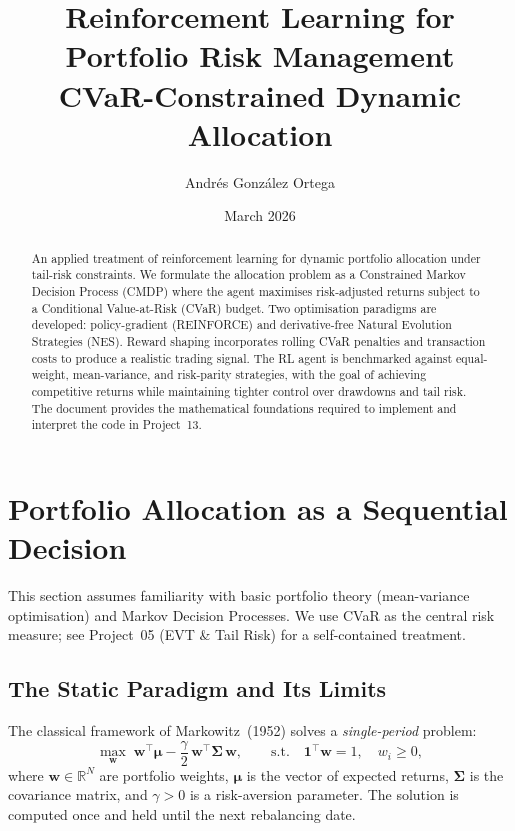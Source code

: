 \documentclass[11pt, a4paper]{article}
\title{%
    \textbf{Reinforcement Learning for Portfolio Risk Management} \\[0.5em]
    \large CVaR-Constrained Dynamic Allocation
}
\author{Andr\'es Gonz\'alez Ortega}
\date{March 2026}
\theoremstyle{definition}
\theoremstyle{plain}
\theoremstyle{remark}
\newcommand{\RV}{\mathbb{R}}
\begin{document}
\maketitle

\begin{abstract}
An applied treatment of reinforcement learning for dynamic portfolio allocation
under tail-risk constraints. We formulate the allocation problem as a Constrained
Markov Decision Process (CMDP) where the agent maximises risk-adjusted returns
subject to a Conditional Value-at-Risk (CVaR) budget. Two optimisation paradigms
are developed: policy-gradient (REINFORCE) and derivative-free Natural Evolution
Strategies (NES). Reward shaping incorporates rolling CVaR penalties and
transaction costs to produce a realistic trading signal. The RL agent is
benchmarked against equal-weight, mean-variance, and risk-parity strategies,
with the goal of achieving competitive returns while maintaining tighter control
over drawdowns and tail risk. The document provides the mathematical foundations
required to implement and interpret the code in Project~13.
\end{abstract}

\tableofcontents
\newpage

\section{Portfolio Allocation as a Sequential Decision}
\label{sec:sequential}

\begin{prereq}
This section assumes familiarity with basic portfolio theory (mean-variance
optimisation) and Markov Decision Processes. We use CVaR as the central
risk measure; see Project~05 (EVT \& Tail Risk) for a self-contained treatment.
\end{prereq}

\subsection{The Static Paradigm and Its Limits}

The classical framework of Markowitz~(1952) solves a \emph{single-period}
problem:
\begin{equation}
    \max_{\bm{w}} \; \bm{w}^\top \bm{\mu}
    - \frac{\gamma}{2}\,\bm{w}^\top \bm{\Sigma}\,\bm{w},
    \qquad
    \text{s.t.}\quad \bm{1}^\top \bm{w} = 1, \quad w_i \geq 0,
    \label{eq:markowitz}
\end{equation}
where $\bm{w} \in \RV^N$ are portfolio weights, $\bm{\mu}$ is the vector of
expected returns, $\bm{\Sigma}$ is the covariance matrix, and $\gamma > 0$ is a
risk-aversion parameter. The solution is computed once and held until the next
rebalancing date.
\end{document}
